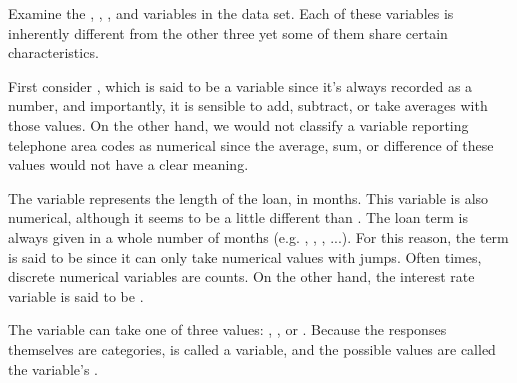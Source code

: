 Examine the , ,
, and  variables
in the  data set.
Each of these variables is inherently different from the
other three yet some of them share certain characteristics.

First consider ,
which is said to be a  variable since
it's always recorded as a number, and importantly, it is
sensible to add, subtract, or take averages with those values.
On the other hand, we would not classify a variable
reporting telephone area codes as numerical since the
average, sum, or difference of these values would not have
a clear meaning.


The  variable represents the length of the loan,
in months.
This variable is also numerical,
although it seems to be a little different than
.
The loan term is always given in a whole number of months
(e.g. , , , ...).
For this reason, the term is said to be 
since it can only take numerical values with jumps.
Often times, discrete numerical variables are counts.
On the other hand, the interest rate variable is said to
be .

The variable  can take
one of three values: , , or .
Because the responses themselves are categories,
 is called
a  variable,
and the possible values are called the variable's .









